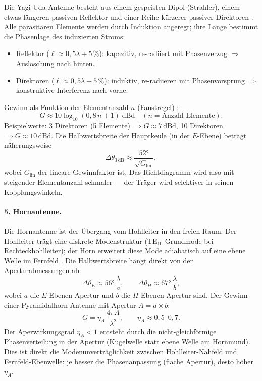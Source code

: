 Die Yagi-Uda-Antenne besteht aus einem gespeisten Dipol (Strahler), einem
etwas längeren passiven Reflektor und einer Reihe kürzerer passiver Direktoren
\cite{Yagi1928,Balanis2016}. Alle parasitären Elemente werden durch Induktion angeregt; ihre Länge
bestimmt die Phasenlage des induzierten Stroms:
\begin{itemize}[nosep]
  \item Reflektor ($\ell \approx 0{,}5\lambda + 5\,\%$): kapazitiv,
    re-radiiert mit Phasenverzug $\Rightarrow$ Auslöschung nach hinten.
  \item Direktoren ($\ell \approx 0{,}5\lambda - 5\,\%$): induktiv,
    re-radiieren mit Phasenvorsprung $\Rightarrow$ konstruktive Interferenz
    nach vorne.
\end{itemize}
Gewinn als Funktion der Elementanzahl $n$ (Faustregel) \EM:
\[
  G \approx 10\log_{10}(0{,}8\,n + 1)\;\mathrm{dBd}
  \quad (n = \text{Anzahl Elemente}).
\]
Beispielwerte: 3 Direktoren (5 Elemente) $\Rightarrow G \approx 7\,\mathrm{dBd}$,
10 Direktoren $\Rightarrow G \approx 10\,\mathrm{dBd}$.
Die Halbwertsbreite der Hauptkeule (in der $E$-Ebene) beträgt näherungsweise
\[
  \Delta\theta_{3\,\mathrm{dB}} \approx \frac{52°}{\sqrt{G_\mathrm{lin}}},
\]
wobei $G_\mathrm{lin}$ der lineare Gewinnfaktor ist. Das Richtdiagramm wird
also mit steigender Elementanzahl schmaler --- der Träger wird selektiver in
seinen Kopplungswinkeln.

\paragraph{5. Hornantenne.}

Die Hornantenne ist der Übergang vom Hohlleiter in den freien Raum.
Der Hohlleiter trägt eine diskrete Modenstruktur (TE$_{10}$-Grundmode
bei Rechteckhohlleiter); der Horn erweitert diese Mode adiabatisch auf
eine ebene Welle im Fernfeld \cite{Balanis2016,Pozar2012}. Die Halbwertsbreite hängt direkt von
den Aperturabmessungen ab:
\[
  \Delta\theta_{E} \approx 56°\,\frac{\lambda}{a}, \qquad
  \Delta\theta_{H} \approx 67°\,\frac{\lambda}{b},
\]
wobei $a$ die $E$-Ebenen-Apertur und $b$ die $H$-Ebenen-Apertur sind.
Der Gewinn einer Pyramidalhorn-Antenne mit Apertur $A = a \times b$:
\[
  G = \eta_A\,\frac{4\pi A}{\lambda^2}, \qquad \eta_A \approx 0{,}5\text{--}0{,}7.
\]
Der Aperwirkungsgrad $\eta_A < 1$ entsteht durch die nicht-gleichförmige
Phasenverteilung in der Apertur (Kugelwelle statt ebene Welle am Hornmund).
Dies ist direkt die Modenunverträglichkeit zwischen Hohlleiter-Nahfeld und
Fernfeld-Ebenwelle: je besser die Phasenanpassung (flache Apertur), desto
höher $\eta_A$.

